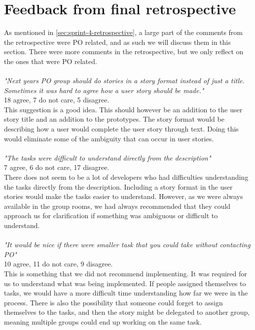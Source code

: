 \section{Feedback from final retrospective}\label{sec:retrospective-discussion}
As mentioned in \autoref{sec:sprint-4-retrospective}, a large part of the comments from the retrospective were PO related, and as such we will discuss them in this section.
There were more comments in the retrospective, but we only reflect on the ones that were PO related.
\\\\
\textit{"Next years PO group should do stories in a story format instead of just a title. Sometimes it was hard to agree how a user story should be made."}
\\
18 agree, 7 do not care, 5 disagree.
\\
This suggestion is a good idea. 
This should however be an addition to the user story title and an addition to the prototypes. 
The story format would be describing how a user would complete the user story through text. 
Doing this would eliminate some of the ambiguity that can occur in user stories.
\\\\
\textit{"The tasks were difficult to understand directly from the description"}
\\
7 agree, 6 do not care, 17 disagree.
\\
There does not seem to be a lot of developers who had difficulties understanding the tasks directly from the description. 
Including a story format in the user stories would make the tasks easier to understand.
However, as we were always available in the group rooms, we had always recommended that they could approach us for clarification if something was ambiguous or difficult to understand. 
\\\\
\textit{"It would be nice if there were smaller task that you could take without contacting PO"}
\\
10 agree, 11 do not care, 9 disagree.
\\
This is something that we did not recommend implementing. 
It was required for us to understand what was being implemented. 
If people assigned themselves to tasks, we would have a more difficult time understanding how far we were in the process.
There is also the possibility that someone could forget to assign themselves to the tasks, and then the story might be delegated to another group, meaning multiple groups could end up working on the same task.
